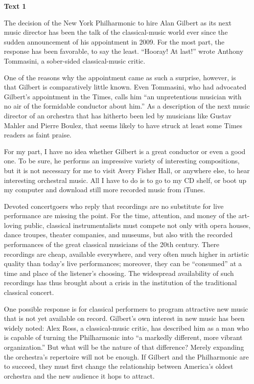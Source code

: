 \begin{center}\textbf{Text 1}\end{center}

The decision of the New York Philharmonic to hire Alan Gilbert as its next music director has been the talk of the classical-music world ever since the sudden announcement of his appointment in 2009. For the most part, the response has been favorable, to say the least. ``Hooray! At last!'' wrote Anthony Tommasini, a sober-sided classical-music critic. 

One of the reasons why the appointment came as such a surprise, however, is that Gilbert is comparatively little known. Even Tommasini, who had advocated Gilbert’s appointment in the Times, calls him ``an unpretentious musician with no air of the formidable conductor about him.'' As a description of the next music director of an orchestra that has hitherto been led by musicians like Gustav Mahler and Pierre Boulez, that seems likely to have struck at least some Times readers as faint praise.

For my part, I have no idea whether Gilbert is a great conductor or even a good one. To be sure, he performs an impressive variety of interesting compositions, but it is not necessary for me to visit Avery Fisher Hall, or anywhere else, to hear interesting orchestral music. All I have to do is to go to my CD shelf, or boot up my computer and download still more recorded music from iTunes.

Devoted concertgoers who reply that recordings are no substitute for live performance are missing the point. For the time, attention, and money of the art-loving public, classical instrumentalists must compete not only with opera houses, dance troupes, theater companies, and museums, but also with the recorded performances of the great classical musicians of the 20th century. There recordings are cheap, available everywhere, and very often much higher in artistic quality than today's live performances; moreover, they can be ``consumed'' at a time and place of the listener's choosing. The widespread availability of such recordings has thus brought about a crisis in the institution of the traditional classical concert.

One possible response is for classical performers to program attractive new music that is not yet available on record. Gilbert’s own interest in new music has been widely noted: Alex Ross, a classical-music critic, has described him as a man who is capable of turning the Philharmonic into ``a markedly different, more vibrant organization.'' But what will be the nature of that difference? Merely expanding the orchestra's repertoire will not be enough. If Gilbert and the Philharmonic are to succeed, they must first change the relationship between America's oldest orchestra and the new audience it hops to attract.

